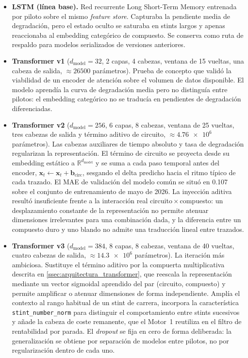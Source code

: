 \begin{itemize}
    \item \textbf{LSTM (línea base).} Red recurrente Long Short-Term Memory \cite{hochreiter1997lstm} entrenada por piloto sobre el mismo \textit{feature store}. Capturaba la pendiente media de degradación, pero el estado oculto se saturaba en stints largos y apenas reaccionaba al embedding categórico de compuesto. Se conserva como ruta de respaldo para modelos serializados de versiones anteriores.

    \item \textbf{Transformer v1} ($d_\text{model} = 32$, 2 capas, 4 cabezas, ventana de 15 vueltas, una cabeza de salida, $\approx \num{26500}$ parámetros). Prueba de concepto que validó la viabilidad de un encoder de atención sobre el volumen de datos disponible. El modelo aprendía la curva de degradación media pero no distinguía entre pilotos: el embedding categórico no se traducía en pendientes de degradación diferenciadas.

    \item \textbf{Transformer v2} ($d_\text{model} = 256$, 6 capas, 8 cabezas, ventana de 25 vueltas, tres cabezas de salida y término aditivo de circuito, $\approx \num{4.76e6}$ parámetros). Las cabezas auxiliares de tiempo absoluto y tasa de degradación regularizan la representación. El término de circuito se proyecta desde su embedding estático a $\mathbb{R}^{d_\text{model}}$ y se suma a cada paso temporal antes del encoder, $\mathbf{x}_t \leftarrow \mathbf{x}_t + \mathbf{b}_\text{circ}$, sesgando el delta predicho hacia el ritmo típico de cada trazado. El MAE de validación del modelo común se situó en \num{0.107} sobre el conjunto de entrenamiento de mayo de 2026. La inyección aditiva resultó insuficiente frente a la interacción real circuito\,$\times$\,compuesto: un desplazamiento constante de la representación no permite atenuar dimensiones irrelevantes para una combinación dada, y la diferencia entre un compuesto duro y uno blando no admite una traducción lineal entre trazados.

    \item \textbf{Transformer v3} ($d_\text{model} = 384$, 8 capas, 8 cabezas, ventana de 40 vueltas, cuatro cabezas de salida, $\approx \num{14.3e6}$ parámetros). La iteración más ambiciosa. Sustituye el término aditivo por la compuerta multiplicativa descrita en \ref{ssec:arquitectura_transformer}, que reescala la representación mediante un vector sigmoidal aprendido del par (circuito, compuesto) y permite amplificar o atenuar dimensiones de forma independiente. Amplía el contexto al rango habitual de un stint de carrera, incorpora la característica \texttt{stint\_number\_norm} para distinguir el comportamiento entre stints sucesivos y añade la cabeza de coste remanente, que el Motor~1 reutiliza en el filtro de rentabilidad por parada. El \textit{dropout} se fija en cero de forma deliberada: la generalización se obtiene por separación de modelos entre pilotos, no por regularización dentro de cada uno.
\end{itemize}

